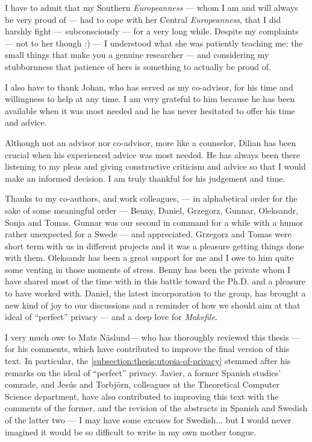 I have to admit that my Southern \emph{Europeanness} --- whom I am and will always 
be very proud of --- had to cope with her Central \emph{Europeanness}, that I did 
harshly fight --- subconsciously --- for a very long while. Despite my complaints 
--- not to her though :) --- I understood what she was patiently teaching me: the 
small things that make you a genuine researcher --- and considering my stubbornness 
that patience of hers is something to actually be proud of.

I also have to thank Johan, who has served as my co-advisor, for his time and willingness 
to help at any time. I am very grateful to him because he has been available when 
it was most needed and he has never hesitated to offer his time and advice. 

Although not an advisor nor co-advisor, more like a counselor, Dilian has been crucial 
when his experienced advice was most needed. He has always been there listening 
to my pleas and giving constructive criticism and advice so that I would make an 
informed decision. I am truly thankful for his judgement and time.

Thanks to my co-authors, and work colleagues, --- in alphabetical order for the 
sake of some meaningful order --- Benny, Daniel, Grzegorz, Gunnar, Oleksandr, Sonja 
and Tomas. Gunnar was our second in command for a while with a humor rather unexpected 
for a Swede --- and appreciated. Grzegorz and Tomas were short term with us in different 
projects and it was a pleasure getting things done with them. Oleksandr has been 
a great support for me and I owe to him quite some venting in those moments of stress. 
Benny has been the private whom I have shared most of the time with in this battle toward 
the Ph.D. and a pleasure to have worked with. Daniel, the latest incorporation 
to the group, has brought a new kind of joy to our discussions and a reminder of 
how we should aim at that ideal of ``perfect'' privacy --- and a deep love for 
\emph{Makefile}.

I very much owe to Mats N\"{a}slund--- who has thoroughly reviewed this thesis --- 
for his comments, which have contributed to improve the final version of this text. 
In particular, the \cref{subsection:thesis:utopia-of-privacy} stemmed after his 
remarks on the ideal of ``perfect'' privacy. Javier, a former Spanish studies' comrade, 
and Jes\'{u}s and Torbj\"{o}rn, colleagues at the Theoretical Computer Science department, 
have also contributed to improving this text with the comments of the former, and 
the revision of the abstracts in Spanish and Swedish of the latter two --- I may 
have some excuses for Swedish... but I would never imagined it would be so difficult 
to write in my own mother tongue. 

